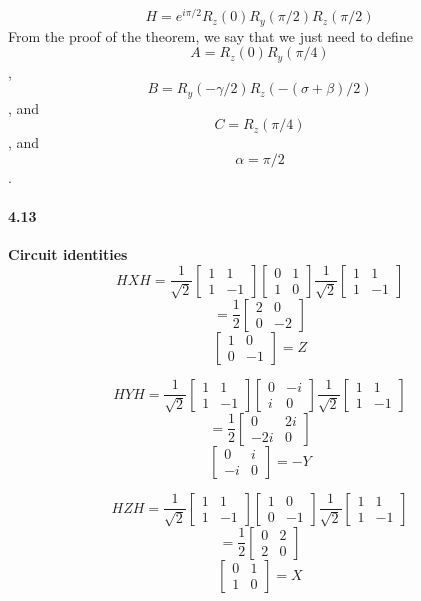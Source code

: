 $$H = e^{i\pi /2}R_z(0)R_y(\pi /2)R_z(\pi /2)$$
From the proof of the theorem, we say that we just need to define $$A = R_z(0)R_y(\pi/4)$$, $$B = R_y(-\gamma/2)R_z(-(\sigma+\beta)/2)$$, and $$C = R_z(\pi/4)$$, and $$\alpha = \pi /2$$. 

\paragraph{4.13} \textbf{Circuit identities}
\\

$$HXH = \frac{1}{\sqrt{2}}\begin{bmatrix}1 & 1\\1 & -1\end{bmatrix}\begin{bmatrix}0 & 1\\1 & 0\end{bmatrix}\frac{1}{\sqrt{2}}\begin{bmatrix}1 & 1\\1 & -1\end{bmatrix}$$
$$= \frac{1}{2}\begin{bmatrix}2 & 0\\0 & -2\end{bmatrix}$$
$$\begin{bmatrix}1 & 0\\0 & -1\end{bmatrix} = Z$$


$$HYH = \frac{1}{\sqrt{2}}\begin{bmatrix}1 & 1\\1 & -1\end{bmatrix}\begin{bmatrix}0 & -i\\i & 0\end{bmatrix}\frac{1}{\sqrt{2}}\begin{bmatrix}1 & 1\\1 & -1\end{bmatrix}$$
$$= \frac{1}{2}\begin{bmatrix}0 & 2i\\-2i & 0\end{bmatrix}$$
$$\begin{bmatrix}0 & i\\-i & 0\end{bmatrix} = -Y$$


$$HZH = \frac{1}{\sqrt{2}}\begin{bmatrix}1 & 1\\1 & -1\end{bmatrix}\begin{bmatrix}1 & 0\\0 & -1\end{bmatrix}\frac{1}{\sqrt{2}}\begin{bmatrix}1 & 1\\1 & -1\end{bmatrix}$$
$$= \frac{1}{2}\begin{bmatrix}0 & 2\\2 & 0\end{bmatrix}$$
$$\begin{bmatrix}0 & 1\\1 & 0\end{bmatrix} = X$$

